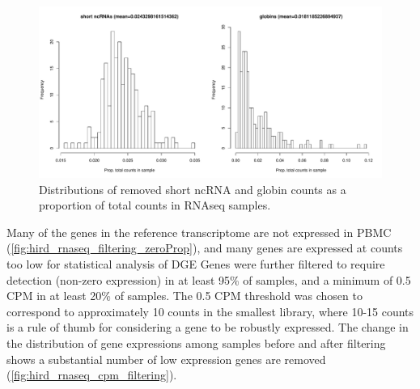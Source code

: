 
\begin{figure}
    \centering
    \includegraphics[width=1.0\textwidth, page=1]{mainmatter/figures/chapter_02/rnaseq_data_setup.per_sample.short_ncRNA_globin_levels_hist.pdf}
    \caption{Distributions of removed short ncRNA and globin counts as a proportion of total counts in \gls{RNAseq} samples.}
    \label{fig:hird_shortncRNA_and_globins}
\end{figure}

Many of the genes in the reference transcriptome are not expressed in \gls{PBMC} (\cref{fig:hird_rnaseq_filtering_zeroProp}), and many genes are expressed at counts too low for statistical analysis of \gls{DGE}
Genes were further filtered to require detection (non-zero expression) in at least 95\% of samples, and a minimum of 0.5 \gls{CPM} in at least 20\% of samples.
The 0.5 \gls{CPM} threshold was chosen to correspond to approximately 10 counts in the smallest library, where 10-15 counts is a rule of thumb for considering a gene to be robustly expressed\autocite{chen2016ReadsGenesPathways}.
The change in the distribution of gene expressions among samples before and after filtering shows a substantial number of low expression genes are removed (\cref{fig:hird_rnaseq_cpm_filtering}).

